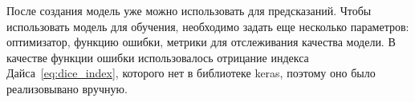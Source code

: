 После создания модель уже можно использовать для предсказаний. Чтобы использовать модель для обучения, необходимо задать еще несколько параметров: оптимизатор, функцию ошибки, метрики для отслеживания качества модели. В качестве функции ошибки использовалось отрицание индекса Дайса~\eqref{eq:dice_index}, которого нет в библиотеке keras, поэтому оно было реализовывано вручную.
